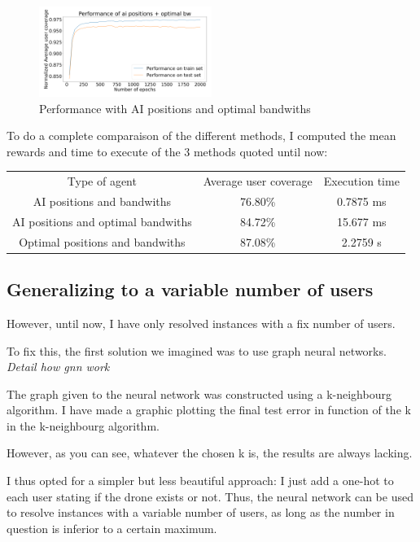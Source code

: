 \documentclass[letterpaper]{article}
\begin{document}
\begin{figure}[H]
    \centering
    \includegraphics[width=0.5\textwidth]{images/mix_results.png}
    \caption{Performance with AI positions and optimal bandwiths}
\end{figure}

To do a complete comparaison of the different methods, I computed the mean rewards and time to execute of the 3 methods quoted until now:

\begin{center}
    \begin{tabular}{ c c c }
     Type of agent & Average user coverage & Execution time \\ 
     AI positions and bandwiths & 76.80\% & 0.7875 ms \\  
     AI positions and optimal bandwiths & 84.72\% & 15.677 ms  \\
     Optimal positions and bandwiths &  87.08\% & 2.2759 s 
    \end{tabular}
    \end{center}

\subsection{Generalizing to a variable number of users}

However, until now, I have only resolved instances with a fix number of users.

To fix this, the first solution we imagined was to use graph neural networks.
\textit{Detail how gnn work}

The graph given to the neural network was constructed using a k-neighbourg algorithm.
I have made a graphic plotting the final test error in function of the k in the k-neighbourg algorithm.

However, as you can see, whatever the chosen k is, the results are always lacking.

I thus opted for a simpler but less beautiful approach: I just add a one-hot to each user stating if the drone exists or not.
Thus, the neural network can be used to resolve instances with a variable number of users, as long as the number in question is inferior to a certain maximum.
\end{document}
